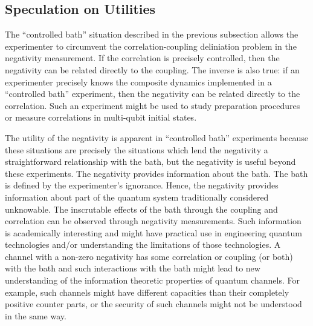 \subsection{Speculation on Utilities}

The ``controlled bath'' situation described in the previous subsection allows the experimenter to circumvent the correlation-coupling deliniation problem in the negativity measurement.  If the correlation is precisely controlled, then the negativity can be related directly to the coupling.  The inverse is also true: if an experimenter precisely knows the composite dynamics implemented in a ``controlled bath'' experiment, then the negativity can be related directly to the correlation.  Such an experiment might be used to study preparation procedures or measure correlations in multi-qubit initial states.  

The utility of the negativity is apparent in ``controlled bath'' experiments because these situations are precisely the situations which lend the negativity a straightforward relationship with the bath, but the negativity is useful beyond these experiments.  The negativity provides information about the bath.  The bath is defined by the experimenter's ignorance.  Hence, the negativity provides information about part of the quantum system traditionally considered unknowable.  The inscrutable effects of the bath through the coupling and correlation can be observed through negativity measurements.  Such information is academically interesting and might have practical use in engineering quantum technologies and/or understanding the limitations of those technologies.  A channel with a non-zero negativity has some correlation or coupling (or both) with the bath and such interactions with the bath might lead to new understanding of the information theoretic properties of quantum channels.  For example, such channels might have different capacities than their completely positive counter parts, or the security of such channels might not be understood in the same way.